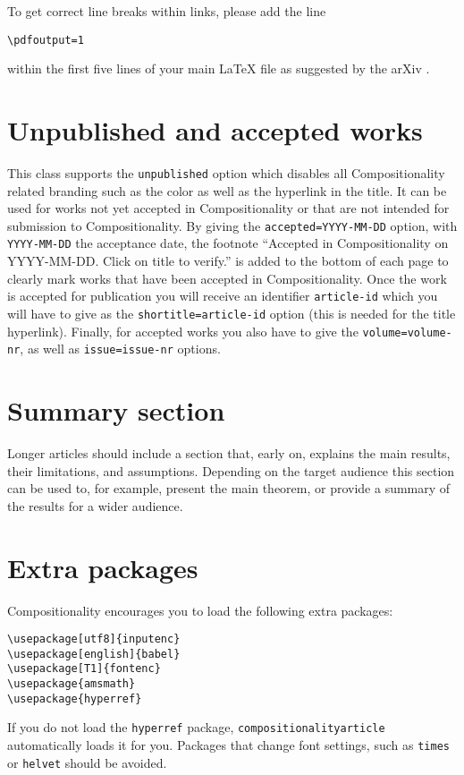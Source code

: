 \documentclass[
    accepted=2020-05-01,
    published=true,
    issue=1, 
    volume=2, 
    a4paper,
]{compositionalityarticle}
\begin{document}
To get correct line breaks within links, please add the line 
\begin{verbatim}
\pdfoutput=1
\end{verbatim}
within the first five lines of your main LaTeX file as suggested by the arXiv \cite{arxivpdfoutput}.

\section{Unpublished and accepted works}
This class supports the \texttt{unpublished} option which disables all Compositionality related branding such as the color as well as the hyperlink in the title.
It can be used for works not yet accepted in Compositionality or  that are not intended for submission to Compositionality.
By giving the \texttt{accepted=YYYY-MM-DD} option, with \texttt{YYYY-MM-DD} the acceptance date, the footnote ``Accepted in Compositionality on YYYY-MM-DD. Click on title to verify.'' is  added to the bottom of each page to clearly mark works that have been accepted in Compositionality. Once the work is accepted for publication you will receive an identifier {\tt article-id} which you will have to give as the {\tt shortitle=article-id} option (this is needed for the title hyperlink). Finally, for accepted works you also have to  give the  \texttt{volume=volume-nr}, as well as \texttt{issue=issue-nr} options.

\section{Summary section}
Longer articles should include a section that, early on, explains the main results, their limitations, and assumptions.
Depending on the target audience this section can be used to, for example, present the main theorem, or provide a summary of the results for a wider audience.

\section{Extra packages}
Compositionality encourages you to load the following extra packages:
\begin{verbatim}
\usepackage[utf8]{inputenc}
\usepackage[english]{babel}
\usepackage[T1]{fontenc}
\usepackage{amsmath}
\usepackage{hyperref}
\end{verbatim}
If you do not load the \texttt{hyperref} package, \texttt{compositionalityarticle} automatically loads it for you.
Packages that change font settings, such as \texttt{times} or \texttt{helvet} should be avoided.
\end{document}
